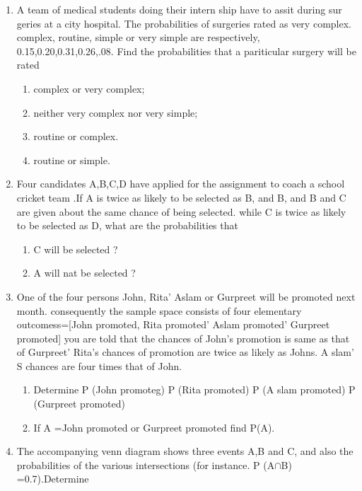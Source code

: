 \documentclass[12pt]{article}
\begin{document}
\begin{enumerate}
\item A team of medical students doing their intern ship have to assit during sur geries at a city hospital. The probabilities of surgeries rated as very complex. complex, routine, simple or very simple are respectively, 0.15,0.20,0.31,0.26,.08. Find the probabilities that a pariticular surgery will be rated
\begin{enumerate}
\item complex or very complex;
\item neither very complex nor very simple;
\item routine or complex. 
\item routine or simple.
\end{enumerate}
\item Four candidates A,B,C,D have applied for the assignment to coach a school cricket team .If A is twice as likely to be selected as B, and B, and B and C are given about the same chance of being selected. while C is twice as likely to be selected as D, what are the probabilities that
\begin{enumerate}
\item C will be selected ?
\item A will nat be selected ?
\end{enumerate}
\item One of the four persons John, Rita' Aslam or Gurpreet will be promoted next month. consequently the sample space consists of four elementary outcomess=[John promoted, Rita promoted' Aslam promoted' Gurpreet promoted] you are told that the chances of John's promotion is same as that of Gurpreet' Rita's chances of promotion are twice as likely as Johns. A slam' S chances are four times that of John.
\begin{enumerate}
\item Determine P (John promoteg)
  P (Rita promoted)
P (A slam promoted)
P (Gurpreet promoted)
\item If A ={John promoted or Gurpreet promoted} find P(A).
\end{enumerate}
\item The accompanying venn diagram shows three events A,B and C, and also the probabilities of the various intersections (for instance. P (A$\cap$B) =0.7).Determine

\end{enumerate}
\end{document}
